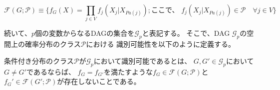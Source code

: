 \begin{equation}
  \mathcal F(G;\mathcal P) \equiv \{ f_G(X) = \prod_{j \in V} f_j(X_j|X_{Pa(j)}) ;
  \text{ここで、 } f_j(X_j|X_{Pa(j)}) \in \mathcal P \quad \forall j \in V \}
\end{equation}

続いて、$p$個の変数からなるDAGの集合を$\mathcal G_p$と表記する。
そこで、DAG $\mathcal G_p$の空間上の確率分布のクラス$\mathcal P$における
識別可能性を以下のように定義する。

\begin{df}[識別可能性]
  条件付き分布のクラス$\mathcal P$が$\mathcal G_p$において識別可能であるとは、
  $G,G' \in \mathcal G_p$において$G \neq G'$であるならば、
  $f_G = f_{G'}$を満たすような$f_G \in \mathcal F(G; \mathcal P)$と
  $f_G' \in \mathcal F(G'; \mathcal P)$が存在しないことである。
\end{df}
